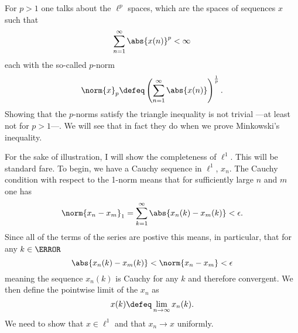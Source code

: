 \documentclass[12pt,oneside]{book}
\begin{document}
For \( p > 1 \) one talks about the \( \ell^p \) spaces, which are the spaces of
sequences \( x \) such that
\begin{equation*}
	\sum_{n = 1}^{\infty} \abs{x(n)}^p < \infty 
\end{equation*}
each with the so-called \( p \)-norm
\begin{equation*}
	\norm{x}_p \defeq \left(\sum_{n = 1}^{\infty} \abs{x(n)}\right)^{\frac{1}{p}}.
\end{equation*}
Showing that the \( p \)-norms satisfy the triangle inequality is not trivial ---at least
not for \( p > 1 \)---. We will see that in fact they do when we prove Minkowski's
inequality. 

For the sake of illustration, I will show the completeness of \( \ell^1 \). This will be
standard fare. To begin, we have a Cauchy sequence in	\( \ell^1 \), \( x_n \). The Cauchy condition
with respect to the 1-norm means that for sufficiently large \( n \) and \( m \) one has
\begin{equation*}
	\norm{x_n - x_m}_1 = \sum_{k = 1}^{\infty} \abs{x_n(k) - x_m(k)} < \epsilon. 
\end{equation*}
Since all of the terms of the series are postive this means, in particular, that for any
\( k \in \N \)
\begin{equation*}
	\abs{x_n(k) - x_m(k)} < \norm{x_n - x_m} < \epsilon
\end{equation*}
meaning the sequence \( x_n(k) \) is Cauchy for any \( k \) and therefore convergent. We
then define the pointwise limit of the \( x_n \) as 
\begin{equation*}
	x(k) \defeq \lim_{n \to \infty} x_n(k).
\end{equation*}
We need to show that \( x \in \ell^1 \) and that \( x_n \to x \) uniformly.
\end{document}
